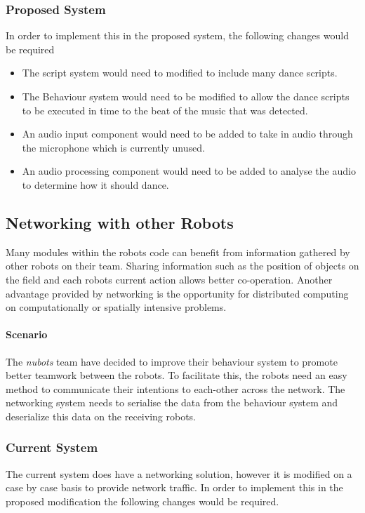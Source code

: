 \documentclass[english,12pt]{scrartcl}
\begin{document}
			\subsubsection{Proposed System}
				In order to implement this in the proposed system, the following changes would be required
				\begin{itemize}
					\item The script system would need to modified to include many dance scripts.
					\item The Behaviour system would need to be modified to allow the dance scripts to be executed in time to the beat of the music that was detected.
					\item An audio input component would need to be added to take in audio through the microphone which is currently unused.
					\item An audio processing component would need to be added to analyse the audio to determine how it should dance.
				\end{itemize}



				
		\subsection{Networking with other Robots}
			Many modules within the robots code can benefit from information gathered by other robots on their team. Sharing information such as the position of objects on the field and each robots current action allows better co-operation.
			Another advantage provided by networking is the opportunity for distributed computing on computationally or spatially intensive problems.
			
			\paragraph{Scenario} The \emph{\gls{nubots}} team have decided to improve their behaviour system to promote better teamwork between the robots.
			To facilitate this, the robots need an easy method to communicate their intentions to each-other across the network.
			The networking system needs to serialise the data from the behaviour system and deserialize this data on the receiving robots.
			
			\subsubsection{Current System}
				The current system does have a networking solution, however it is modified on a case by case basis to provide network traffic.
				In order to implement this in the proposed modification the following changes would be required.
								
\end{document}
